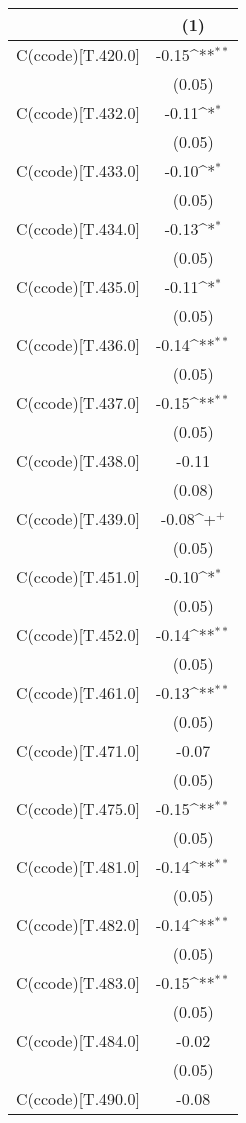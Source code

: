 {
\def\sym#1{\ifmmode^{#1}\else\(^{#1}\)\fi}
\begin{tabular}{@{\extracolsep{2pt}}l*{1}{c}@{}}
\hline\hline


 & (1) \\
\hline
C(ccode)[T.420.0] & -0.15\sym{**} \\
 & (0.05) \\
C(ccode)[T.432.0] & -0.11\sym{*} \\
 & (0.05) \\
C(ccode)[T.433.0] & -0.10\sym{*} \\
 & (0.05) \\
C(ccode)[T.434.0] & -0.13\sym{*} \\
 & (0.05) \\
C(ccode)[T.435.0] & -0.11\sym{*} \\
 & (0.05) \\
C(ccode)[T.436.0] & -0.14\sym{**} \\
 & (0.05) \\
C(ccode)[T.437.0] & -0.15\sym{**} \\
 & (0.05) \\
C(ccode)[T.438.0] & -0.11 \\
 & (0.08) \\
C(ccode)[T.439.0] & -0.08\sym{+} \\
 & (0.05) \\
C(ccode)[T.451.0] & -0.10\sym{*} \\
 & (0.05) \\
C(ccode)[T.452.0] & -0.14\sym{**} \\
 & (0.05) \\
C(ccode)[T.461.0] & -0.13\sym{**} \\
 & (0.05) \\
C(ccode)[T.471.0] & -0.07 \\
 & (0.05) \\
C(ccode)[T.475.0] & -0.15\sym{**} \\
 & (0.05) \\
C(ccode)[T.481.0] & -0.14\sym{**} \\
 & (0.05) \\
C(ccode)[T.482.0] & -0.14\sym{**} \\
 & (0.05) \\
C(ccode)[T.483.0] & -0.15\sym{**} \\
 & (0.05) \\
C(ccode)[T.484.0] & -0.02 \\
 & (0.05) \\
C(ccode)[T.490.0] & -0.08 \\

\end{tabular}}

